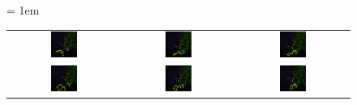 \begin{figure}[h]
	\centering
	\tabcolsep = 1em
	\mySfFamily
	\begin{tabular}{c c c}
		\includegraphics[width = 0.25\textwidth]{../images_CMYK/2ajf_animation1_cropped} & \includegraphics[width = 0.25\textwidth]{../images_CMYK/2ajf_animation2_cropped} & \includegraphics[width = 0.25\textwidth]{../images_CMYK/2ajf_animation3_cropped} \\[3ex]
		\includegraphics[width = 0.25\textwidth]{../images_CMYK/6vw1_animation1_cropped} & \includegraphics[width = 0.25\textwidth]{../images_CMYK/6vw1_animation2_cropped} & \includegraphics[width = 0.25\textwidth]{../images_CMYK/6vw1_animation3_cropped}

\end{tabular}
\end{figure}
